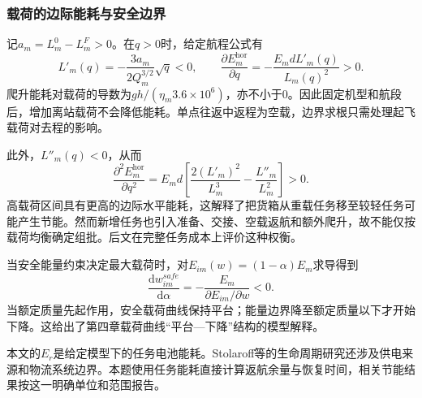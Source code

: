 \subsubsection{载荷的边际能耗与安全边界}
记$a_m=L_m^0-L_m^F>0$。在$q>0$时，给定航程公式有
\begin{equation}
L'_m(q)=-\frac{3a_m}{2Q_m^{3/2}}\sqrt q<0,\qquad
\frac{\partial E_m^{\mathrm{hor}}}{\partial q}
=-\frac{E_m dL'_m(q)}{L_m(q)^2}>0.
\label{eq:energy_load_derivative}
\end{equation}
爬升能耗对载荷的导数为$gh/(\eta_m3.6\times10^6)$，亦不小于0。因此固定机型和航段后，增加离站载荷不会降低能耗。单点往返中返程为空载，边界求根只需处理起飞载荷对去程的影响。

此外，$L''_m(q)<0$，从而
\begin{equation}
\frac{\partial^2 E_m^{\mathrm{hor}}}{\partial q^2}
=E_md\left[\frac{2(L'_m)^2}{L_m^3}-\frac{L''_m}{L_m^2}\right]>0.
\label{eq:energy_load_convexity}
\end{equation}
高载荷区间具有更高的边际水平能耗，这解释了把货箱从重载任务移至较轻任务可能产生节能。然而新增任务也引入准备、交接、空载返航和额外爬升，故不能仅按载荷均衡确定组批。后文在完整任务成本上评价这种权衡。

当安全能量约束决定最大载荷时，对$E_{im}(w)=(1-\alpha)E_m$求导得到
\begin{equation}
\frac{\mathrm d w_{im}^{safe}}{\mathrm d\alpha}
=-\frac{E_m}{\partial E_{im}/\partial w}<0.
\label{eq:payload_alpha_derivative}
\end{equation}
当额定质量先起作用，安全载荷曲线保持平台；能量边界降至额定质量以下才开始下降。这给出了第四章载荷曲线“平台—下降”结构的模型解释。

本文的$E_r$是给定模型下的任务电池能耗。Stolaroff等的生命周期研究还涉及供电来源和物流系统边界\cite{stolaroff2018,stolaroff2018corr}。本题使用任务能耗直接计算返航余量与恢复时间，相关节能结果按这一明确单位和范围报告。
